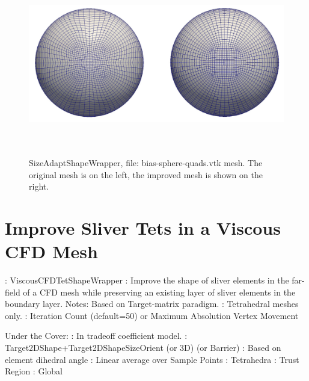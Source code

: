 \begin{figure}[htbp]
\begin{center}
    \includegraphics[height=80mm]{figures/bias-sphere-quads}
    \caption{SizeAdaptShapeWrapper, file: bias-sphere-quads.vtk mesh. The original mesh is on the left, the improved mesh is shown on the right.}
    \label{fig:shest_grid32}
\end{center}
\end{figure}

\newpage

\section{Improve Sliver Tets in a Viscous CFD Mesh} \label{sec:ViscousCFDTetShapeWrapper}

: ViscousCFDTetShapeWrapper \newline
{}: Improve the shape of sliver elements in the far-field
of a CFD mesh while
preserving an existing layer of sliver elements in the boundary layer. \newline
\noindent Notes: Based on Target-matrix paradigm.  \newline
{}: Tetrahedral meshes only.  \newline
{}: Iteration Count (default=50) or Maximum Absolution Vertex Movement \newline \newline

\noindent Under the Cover: \newline
{}: In tradeoff coefficient model. \newline
{}: Target2DShape+Target2DShapeSizeOrient (or 3D) (or Barrier) \newline
{}: Based on element dihedral angle \newline
{}: Linear average over Sample Points \newline
{}: Tetrahedra \newline
{}: Trust Region \newline
{}: Global \newline


